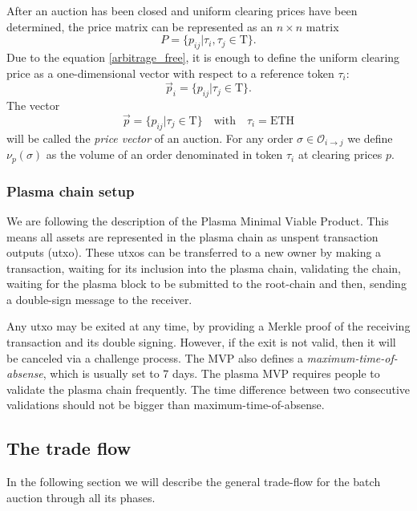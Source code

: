 \documentclass[11pt,parskip=full]{scrartcl}%
\newcommand{\Tau}{\mathrm{T}}
\def\pO{\mathcal{O}}
\def\ra{\rightarrow}
\begin{document}
After an auction has been closed and uniform clearing prices have been determined, the price matrix can be represented as an $n\times n$ matrix 
\[P = \{p_{ij}| \tau_i, \tau_j \in \Tau \}.\]
Due to the equation \ref{arbitrage_free}, it is enough to define the uniform clearing price as a one-dimensional vector with respect to a reference token $\tau_i$:
\[ \vec{p}_i = \{p_{ij}| \tau_j \in \Tau \}.\]
The vector
\begin{equation}
\vec{p} =\{ p_{ij}| \tau_j \in \Tau \} \quad \text{with} \quad \tau_i =\text{ETH}
\label{pricevector}
\end{equation}
will be called the \emph{price vector} of an auction.\newline
For any order $\sigma \in \pO_{i\ra j}$ we define $\nu_p(\sigma)$ as the volume of an order denominated in token $\tau_i$ at clearing prices $p$.


\subsubsection{Plasma chain setup}
We are following the description of the Plasma Minimal Viable Product\cite{MVP}. 
This means all assets are represented in the plasma chain as unspent transaction outputs (utxo). 
These utxos can be transferred to a new owner by making a transaction, waiting for its inclusion into the plasma chain, validating the chain, waiting for the plasma block to be submitted to the root-chain and then, sending a double-sign message to the receiver. 

Any utxo may be exited at any time, by providing a Merkle proof of the receiving transaction and its double signing. 
However, if the exit is not valid, then it will be canceled via a challenge process.
The MVP also defines a \emph{maximum-time-of-absense}\label{exit-time}, which is usually set to 7 days. The plasma MVP requires people to validate the plasma chain frequently.
The time difference between two consecutive validations should not be bigger than maximum-time-of-absense.


\subsection{The trade flow}
\label{subsec:data}

In the following section we will describe the general trade-flow for the batch auction through all its phases.
\end{document}
